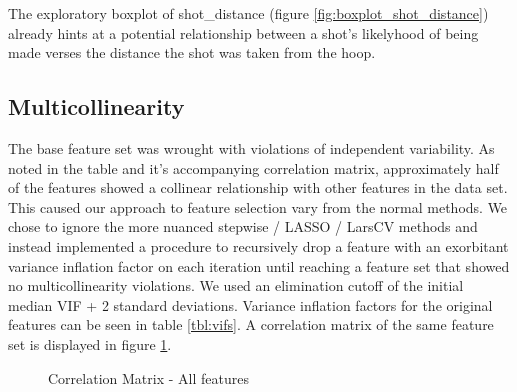 The exploratory boxplot of shot\_distance (figure \ref{fig:boxplot_shot_distance}) already hints at a potential relationship between a shot's likelyhood of being made verses the distance the shot was taken from the hoop.\par



\subsection{Multicollinearity}
\indent The base feature set was wrought with violations of independent variability.  As noted in the table and it's accompanying correlation matrix, approximately half of the features showed a collinear relationship with other features in the data set. This caused our approach to feature selection vary from the normal methods.  We chose to ignore the more nuanced stepwise / LASSO / LarsCV methods and instead implemented a procedure to recursively drop a feature with an exorbitant variance inflation factor on each iteration until reaching a feature set that showed no multicollinearity violations.  We used an elimination cutoff of the initial median VIF + 2 standard deviations.  Variance inflation factors for the original features can be seen in table \ref{tbl:vifs}. A correlation matrix of the same feature set is displayed in figure \ref{fig:corr_matrix_allvars}.

\vskip 1cm
\begin{figure}
    \centering
    \caption{\label{fig:corr_matrix_allvars} Correlation Matrix - All features}
\end{figure}
\vskip 1cm
\cite{cm}

